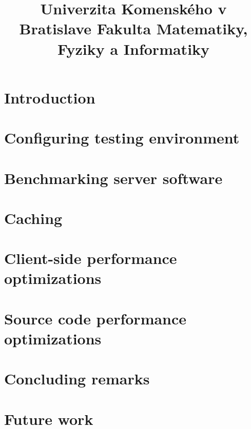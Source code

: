 \documentclass[12pt,a4paper]{bachelor}
\title{Univerzita Komenského v Bratislave Fakulta Matematiky, Fyziky a Informatiky}
\author{\autor}
\begin{document}



\printglossaries


\tableofcontents
\listoffigures
\listoftables

\newpage


\chapter{Introduction}


\chapter{Configuring testing environment}


\chapter{Benchmarking server software}


\chapter{Caching}


\chapter{Client-side performance optimizations}


\chapter{Source code performance optimizations}


\chapter{Concluding remarks}


\chapter{Future work}


\printbibliography



\label{totalpages}
\end{document}
